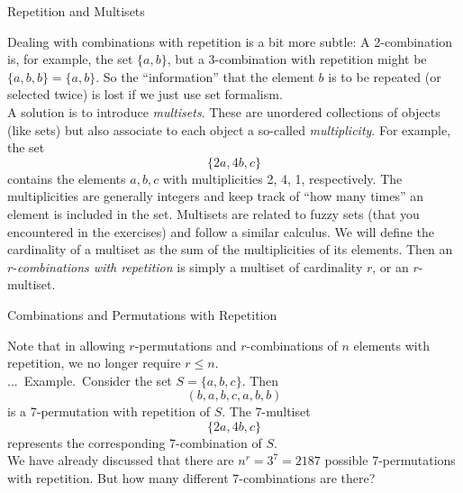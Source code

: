 \documentclass[smaller,hyperref={CJKbookmarks=true}]{beamer}
\newcounter{zhuo}[subsection]
\renewcommand{\thezhuo}{\thesection.\thesubsection.\arabic{zhuo}}
\newenvironment{EXAMPLE}{\stepcounter{zhuo}\alert{\!\thezhuo.~Example.\,}}{}
\begin{document}
\begin{frame}[t]{Repetition and Multisets}
\begin{spacing}{1}
Dealing with combinations with repetition is a bit more subtle: A
2-combination is, for example, the set $\{a,b\}$, but a 3-combination with repetition might be $\{a,b,b\}=\{a,b\}$. So the ``information'' that the element $b$ is to be repeated (or selected twice) is lost if we just use set formalism.\\[6pt]
A solution is to introduce \emph{multisets}. These are unordered collections of
objects (like sets) but also associate to each object a so-called \emph{multiplicity}.
For example, the set
\[\{2a,4b,c\}\]
contains the elements $a, b, c$ with multiplicities 2, 4, 1, respectively. The
multiplicities are generally integers and keep track of ``how many times'' an
element is included in the set. Multisets are related to fuzzy sets (that you
encountered in the exercises) and follow a similar calculus. We will define
the cardinality of a multiset as the sum of the multiplicities of its elements.
Then an $r$-\emph{combinations with repetition} is simply a multiset of cardinality
$r$, or an $r$-multiset.
\end{spacing}
\end{frame}
\begin{frame}[c]{Combinations and Permutations with Repetition}
\begin{spacing}{1.05}
Note that in allowing $r$-permutations and $r$-combinations of $n$ elements
with repetition, we no longer require $r\leq n$.\\[5pt]
\begin{EXAMPLE}
Consider the set $S=\{a,b,c\}$. Then
\[(b,a,b,c,a,b,b)\]
is a 7-permutation with repetition of $S$. The 7-multiset
\[\{2a,4b,c\}\]
represents the corresponding 7-combination of $S$.\\[5pt]
We have already discussed that there are $n^r=3^7=2187$ possible 7-permutations with repetition. But how many different 7-combinations are there?
\end{EXAMPLE}
\end{spacing}
\end{frame}
\end{document}
